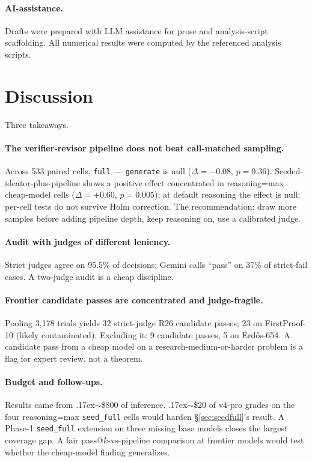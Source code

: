 \documentclass{article}
\begin{document}
\paragraph{AI-assistance.}
Drafts were prepared with LLM assistance for prose and analysis-script
scaffolding.
All numerical results were computed by the referenced analysis scripts.

\section{Discussion}
\label{sec:discussion}

Three takeaways.

\paragraph{The verifier-revisor pipeline does not beat call-matched sampling.}
Across 533 paired cells, \texttt{full}~$-$~\texttt{generate} is null
($\Delta{=}{-}0.08$, $p{=}0.36$).
Seeded-ideator-plus-pipeline shows a positive effect concentrated in reasoning=max
cheap-model cells ($\Delta{=}{+}0.60$, $p{=}0.005$); at default reasoning the
effect is null; per-cell tests do not survive Holm correction.
The recommendation: draw more samples before adding pipeline depth, keep reasoning
on, use a calibrated judge.

\paragraph{Audit with judges of different leniency.}
Strict judges agree on 95.5\% of decisions; Gemini calls ``pass'' on 37\% of
strict-fail cases.
A two-judge audit is a cheap discipline.

\paragraph{Frontier candidate passes are concentrated and judge-fragile.}
Pooling 3{,}178 trials yields 32 strict-judge R26 candidate passes; 23 on
FirstProof-10 (likely contaminated).
Excluding it: 9 candidate passes, 5 on Erd\H{o}s-654.
A candidate pass from a cheap model on a research-medium-or-harder problem is a
flag for expert review, not a theorem.

\paragraph{Budget and follow-ups.}
Results came from {\raise.17ex\hbox{$\scriptstyle\sim$}}\$800 of inference.
{\raise.17ex\hbox{$\scriptstyle\sim$}}\$20 of v4-pro grades on the four reasoning=max
\texttt{seed\_full} cells would harden \S\ref{sec:seedfull}'s result.
A Phase-1 \texttt{seed\_full} extension on three missing base models closes the
largest coverage gap.
A fair pass@$k$-vs-pipeline comparison at frontier models would test whether the
cheap-model finding generalizes.
\end{document}

